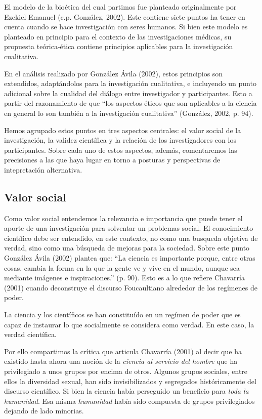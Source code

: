 El modelo de la bioética del cual partimos fue planteado originalmente por
Ezekiel Emanuel (c.p. González, 2002).
Este contiene siete puntos ha tener en cuenta cuando se hace investigación
con seres humanos.
Si bien este modelo es planteado en principio para el contexto de las
investigaciones médicas, su propuesta teórica-ética contiene principios
aplicables para la investigación cualitativa.

En el análisis realizado por González Ávila (2002),
estos principios son extendidos, adaptándolos para la investigación
cualitativa, e incluyendo un punto adicional sobre la cualidad del diálogo entre
investigador y participantes.
Esto a partir del razonamiento de que “los aspectos éticos que son aplicables
a la ciencia en general lo son también a la investigación cualitativa”
(González, 2002, p. 94).

Hemos agrupado estos puntos en tres aspectos centrales: el valor social de la
investigación, la validez científica y la relación de los investigadores con
los participantes.
Sobre cada uno de estos aspectos, además, comentaremos las precisiones a las
que haya lugar en torno a posturas y perspectivas de intepretación alternativa.

\subsection{Valor social}
Como valor social entendemos la relevancia e importancia que puede tener el
aporte de una investigación para solventar un problemas social.
El conocimiento científico debe ser entendido, en este contexto, no como
una busqueda objetiva de verdad, sino como una búsqueda de mejoras para la
sociedad.
Sobre este punto González Ávila (2002) plantea que: “La ciencia es importante
porque, entre otras cosas, cambia la forma en la que la gente ve y vive en el
mundo, aunque sea mediante imágenes e inspiraciones.” (p. 90).
Esto es a lo que refiere Chavarría (2001) cuando deconstruye el discurso
Foucaultiano alrededor de los regímenes de poder.

La ciencia y los científicos se han constituído en un regímen de poder que es
capaz de instaurar lo que socialmente se considera como verdad.
En este caso, la verdad científica.

Por ello compartimos la crítica que articula Chavarría (2001) al decir que ha
existido hasta ahora una noción de la \emph{ciencia al servicio del hombre}
que ha privilegiado a unos grupos por encima de otros.
Algunos grupos sociales, entre ellos la diversidad sexual, han sido
invisibilizados y segregados históricamente del discurso científico.
Si bien la ciencia había perseguido un beneficio para \emph{toda la humanidad}.
Esa misma \emph{humanidad} había sido compuesta de grupos privilegiados
dejando de lado minorias.

